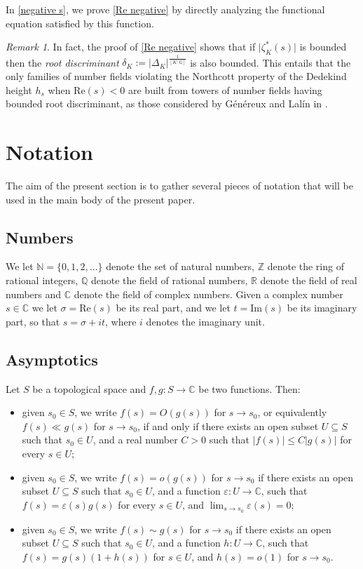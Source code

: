 \documentclass[10pt,a4paper]{amsart}
\theoremstyle{plain}
\theoremstyle{definition}
\theoremstyle{remark}
\newtheorem{remark}[theorem]{Remark}
\begin{document}
In \cref{negative s}, we prove \cref{Re negative} by directly analyzing the functional equation satisfied by this function.

\begin{remark}
    In fact, the proof of \cref{Re negative} shows that if $\lvert \zeta_K^\ast(s) \rvert$ is bounded then the \textit{root discriminant} $\delta_K := \lvert \Delta_K \rvert^{\frac{1}{[K \colon \mathbb{Q}]}}$ is also bounded. This entails that the only families of number fields violating the Northcott property of the Dedekind height $h_s$ when $\mathrm{Re}(s) < 0$ are built from towers of number fields having bounded root discriminant, as those considered by Généreux and Lalín in \cite{GeLa24}.
\end{remark}

\section{Notation}\label{notation}

The aim of the present section is to gather several pieces of notation that will be used in the main body of the present paper.

\subsection{Numbers} We let $\mathbb{N} = \{0,1,2,\dots\}$ denote the set of natural numbers, $\mathbb{Z}$ denote the ring of rational integers, $\mathbb{Q}$ denote the field of rational numbers, $\mathbb{R}$ denote the field of real numbers and $\mathbb{C}$ denote the field of complex numbers.
Given a complex number $s \in \mathbb{C}$ we let $\sigma = \mathrm{Re}(s)$ be its real part, and we let $t = \mathrm{Im}(s)$ be its imaginary part, so that $s = \sigma + i t$, where $i$ denotes the imaginary unit.

\subsection{Asymptotics}
Let $S$ be a topological space and $f,g \colon S \to \mathbb{C}$ be two functions. Then:
\begin{itemize}
    \item given $s_0 \in S$, we write $f(s) = O(g(s))$ for $s \to s_0$, or equivalently $f(s) \ll g(s)$ for $s \to s_0$, if and only if there exists an open subset $U \subseteq S$ such that $s_0 \in U$, and a real number $C>0$ such that $|f(s)| \leq C |g(s)|$ for every $s \in U$;
    \item given $s_0 \in S$, we write $f(s) = o(g(s))$ for $s \to s_0$ if there exists an open subset $U \subseteq S$ such that $s_0 \in U$, and a function $\varepsilon \colon U \to \mathbb{C}$, such that $f(s) = \varepsilon(s) g(s)$ for every $s \in U$, and $\displaystyle{\lim_{s \to s_0} \varepsilon(s) = 0}$;
    \item given $s_0 \in S$, we write $f(s) \sim g(s)$ for $s \to s_0$ if there exists an open subset $U \subseteq S$ such that $s_0 \in U$, and a function $h \colon U \to \mathbb{C}$, such that $f(s) = g(s) (1 + h(s))$ for $s \in U$, and $h(s) = o(1)$ for $s \to s_0$.
\end{itemize}
\end{document}
